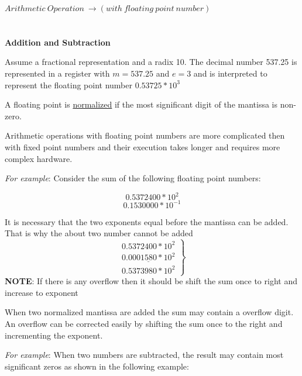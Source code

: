 \documentclass[11pt, a4paper, oneside]{book}
\begin{document}
                $Arithmetic\ Operation\ \rightarrow (with\ floating\ point\ number)$
                \\ \\ \\
                \Large \textbf{Addition and Subtraction}\normalsize

                Assume a fractional representation and a radix 10. The decimal number 537.25 is represented in a register with $m=537.25$ and $e=3$ and is interpreted to represent the floating point number $0.53725*10^3$

                A floating point is \underline{normalized} if the most significant digit of the mantissa is non-zero.

                Arithmetic operations with floating point numbers are more complicated then with fixed point numbers and their execution takes longer and requires more complex hardware.

                \textit{For example}: Consider the sum of the following floating point numbers:

                \begin{equation*}
                0.5372400*10^2
                \end{equation*}
                \begin{equation*}
                0.1530000*10^{-1}
                \end{equation*}

                It is necessary that the two exponents equal before the mantissa can be added. That is why the about two number cannot be added
                \begin{equation*}
                  \left.\begin{matrix}
            0.5372400*10^2 \\ \underline{0.0001580*10^2} \\ 0.5373980*10^2
            \end{matrix}\right\}
                \end{equation*} \textbf{NOTE}: If there is any overflow then it should be shift the sum once to right and increase to exponent

                When two normalized mantissa are added the sum may contain a overflow digit. An overflow can be corrected easily by shifting the sum once to the right and incrementing the exponent.

                \textit{For example}: When two numbers are subtracted, the result may contain most significant zeros as shown in the following example:
\end{document}
